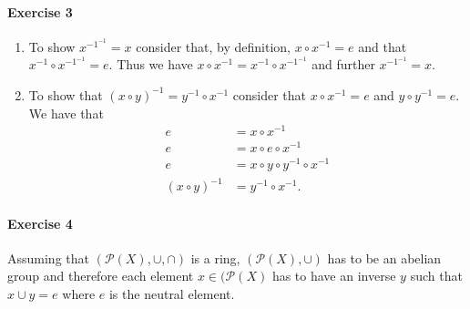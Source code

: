 \documentclass{article}
\begin{document}
\pagebreak
\paragraph{Exercise 3}

\begin{enumerate}
    \item To show $x^{-1^{-1}} = x$ consider that, by definition, $x \circ x^{-1} = e$ and that $x^{-1} \circ x^{-1^{-1}} = e$. Thus we have $x \circ x^{-1} = x^{-1} \circ x^{-1^{-1}}$ and further $x^{-1^{-1}} = x$.
    
    \item To show that $(x \circ y)^{-1} = y^{-1} \circ x^{-1}$ consider that $x \circ x^{-1} = e$ and $y \circ y^{-1} = e$. We have that
    \begin{align*}
        e &= x \circ x^{-1} \\
        e &= x \circ e \circ x^{-1} \\
        e &= x \circ y \circ y^{-1} \circ x^{-1} \\
        (x \circ y)^{-1} &= y^{-1} \circ x^{-1}.
    \end{align*}
\end{enumerate}

\pagebreak
\paragraph{Exercise 4}

Assuming that $(\mathcal{P}(X), \cup, \cap)$ is a ring, $(\mathcal{P}(X), \cup)$ has to be an abelian group and therefore each element $x \in (\mathcal{P}(X)$ has to have an inverse $y$ such that $x \cup y = e$ where $e$ is the neutral element.
\end{document}
